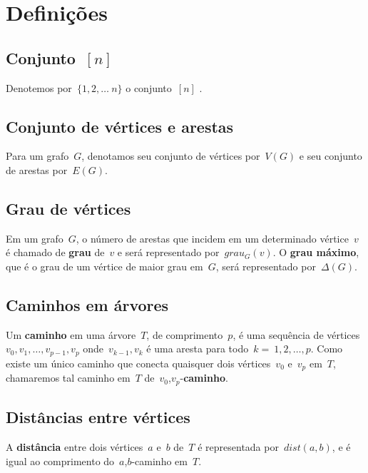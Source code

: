 \documentclass[a4paper,12pt]{article}
\begin{document}
\section{Definições}
	
	\subsection{Conjunto~$[n]$}
	Denotemos por~$\{1,2,\ldots~n\}$
	o conjunto~$[n]$ .

	\subsection{Conjunto de vértices e arestas}
	Para um grafo~$G$, denotamos seu
	conjunto de vértices por~$V(G)$ e seu
	conjunto de arestas por~$E(G)$.

	\subsection{Grau de vértices}
	Em um grafo~$G$, o número de arestas que incidem em um 
	determinado vértice~$v$ é chamado de 
	\textbf{grau} de~$v$ e será representado
	por~$grau_G(v)$. O 
	\textbf{grau máximo}, que é o grau de um vértice de
	maior grau em~$G$, será representado por~$\Delta(G)$.

	\subsection{Caminhos em árvores}
	Um \textbf{caminho} em uma árvore~$T$, de 
	comprimento~$p$, é uma sequência de 
	vértices~$v_0, v_1, \ldots,v_{p-1}, v_p$ 
	onde~$v_{k-1}, v_k$ é uma aresta para todo~$k =~1,2, \ldots, 
	p$. 
	Como existe um único caminho que conecta quaisquer dois 
	vértices~$v_0$ e~$v_p$ em~$T$, chamaremos tal caminho em~$T$ 
	de~$v_0$,$v_p$-\textbf{caminho}.

	\subsection{Distâncias entre vértices}
	A \textbf{distância} entre dois vértices~$a$ e~$b$ de~$T$ é 
	representada por~$dist(a,b)$, e é igual ao comprimento 
	do~$a$,$b$-caminho em~$T$.

		

\newpage

\end{document}
